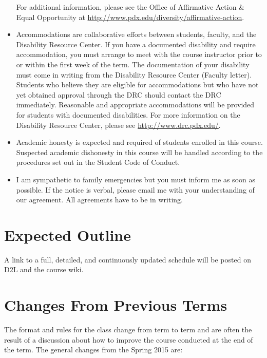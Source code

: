 \documentclass[letterpaper,10pt]{article}
\begin{document}
\begin{itemize}
 For additional information, please see the Office of Affirmative Action \& Equal Opportunity at \url{http://www.pdx.edu/diversity/affirmative-action}.


\item Accommodations are collaborative efforts between students, faculty, and the Disability Resource Center.  If you have a documented disability and require accommodation, you must arrange to meet with the course instructor prior to or within the first week of the term.  The documentation of your disability must come in writing from the Disability Resource Center (Faculty letter).  Students who believe they are eligible for accommodations but who have not yet obtained approval through the DRC should contact the DRC immediately.  Reasonable and appropriate accommodations will be provided for students with documented disabilities.  For more information on the Disability Resource Center, please see \url{http://www.drc.pdx.edu/}. 

\item Academic honesty is expected and required of students enrolled
  in this course.  Suspected academic dishonesty in this course will
  be handled according to the procedures set out in the Student Code
  of Conduct.

\item I am sympathetic to family emergencies but you must inform me as
  soon as possible. If the notice is verbal, please email me with your
  understanding of our agreement. All agreements have to be in
  writing.


\end{itemize}


\section{Expected Outline}
A link to a full, detailed, and continuously updated schedule will be
posted on D2L and the course wiki.


\section{Changes From Previous Terms}
The format and rules for the class change from term to term and are often the result of a discussion about how to improve the course conducted at the end of the term. The general changes from the Spring 2015 are:
\end{document}
